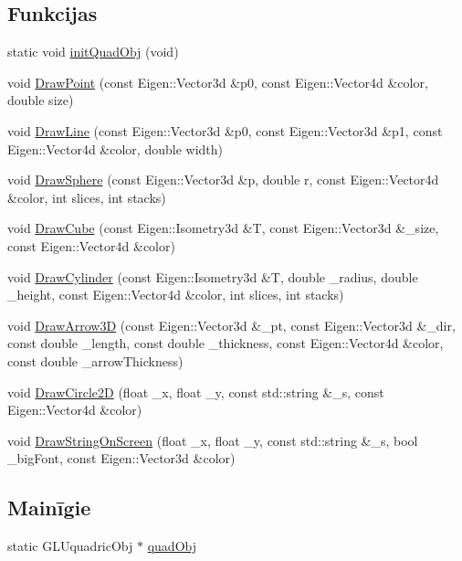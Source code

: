 \subsection*{Funkcijas}
\begin{DoxyCompactItemize}
\item 
static void \hyperlink{namespace_v_p_c_1_1_g_u_i_a43f2493f014244094295c8840b9dc54f}{init\+Quad\+Obj} (void)
\item 
void \hyperlink{namespace_v_p_c_1_1_g_u_i_a7676fc36f15b67e72c9f1bd3a4836755}{Draw\+Point} (const Eigen\+::\+Vector3d \&p0, const Eigen\+::\+Vector4d \&color, double size)
\item 
void \hyperlink{namespace_v_p_c_1_1_g_u_i_a45de6c011f74c08734aa04ce57bb9fd7}{Draw\+Line} (const Eigen\+::\+Vector3d \&p0, const Eigen\+::\+Vector3d \&p1, const Eigen\+::\+Vector4d \&color, double width)
\item 
void \hyperlink{namespace_v_p_c_1_1_g_u_i_ae93b170c02a6812211061109cbb0c4a6}{Draw\+Sphere} (const Eigen\+::\+Vector3d \&p, double r, const Eigen\+::\+Vector4d \&color, int slices, int stacks)
\item 
void \hyperlink{namespace_v_p_c_1_1_g_u_i_a3ab06821c73e252bb864f2e9c9a6e916}{Draw\+Cube} (const Eigen\+::\+Isometry3d \&T, const Eigen\+::\+Vector3d \&\+\_\+size, const Eigen\+::\+Vector4d \&color)
\item 
void \hyperlink{namespace_v_p_c_1_1_g_u_i_a1021ea56c7215b6a592c0046a77677d2}{Draw\+Cylinder} (const Eigen\+::\+Isometry3d \&T, double \+\_\+radius, double \+\_\+height, const Eigen\+::\+Vector4d \&color, int slices, int stacks)
\item 
void \hyperlink{namespace_v_p_c_1_1_g_u_i_a727b1e8916ec599677fa11217d6ddf2b}{Draw\+Arrow3D} (const Eigen\+::\+Vector3d \&\+\_\+pt, const Eigen\+::\+Vector3d \&\+\_\+dir, const double \+\_\+length, const double \+\_\+thickness, const Eigen\+::\+Vector4d \&color, const double \+\_\+arrow\+Thickness)
\item 
void \hyperlink{namespace_v_p_c_1_1_g_u_i_a802b6ee2e4a882e55af30a5d12ff3965}{Draw\+Circle2D} (float \+\_\+x, float \+\_\+y, const std\+::string \&\+\_\+s, const Eigen\+::\+Vector4d \&color)
\item 
void \hyperlink{namespace_v_p_c_1_1_g_u_i_aba7cda15c9d9fa148f09e44915ec78f9}{Draw\+String\+On\+Screen} (float \+\_\+x, float \+\_\+y, const std\+::string \&\+\_\+s, bool \+\_\+big\+Font, const Eigen\+::\+Vector3d \&color)
\end{DoxyCompactItemize}
\subsection*{Mainīgie}
\begin{DoxyCompactItemize}
\item 
static G\+L\+Uquadric\+Obj $\ast$ \hyperlink{namespace_v_p_c_1_1_g_u_i_a0a2d963cfdc95564bad5be52225b4df8}{quad\+Obj}
\end{DoxyCompactItemize}


